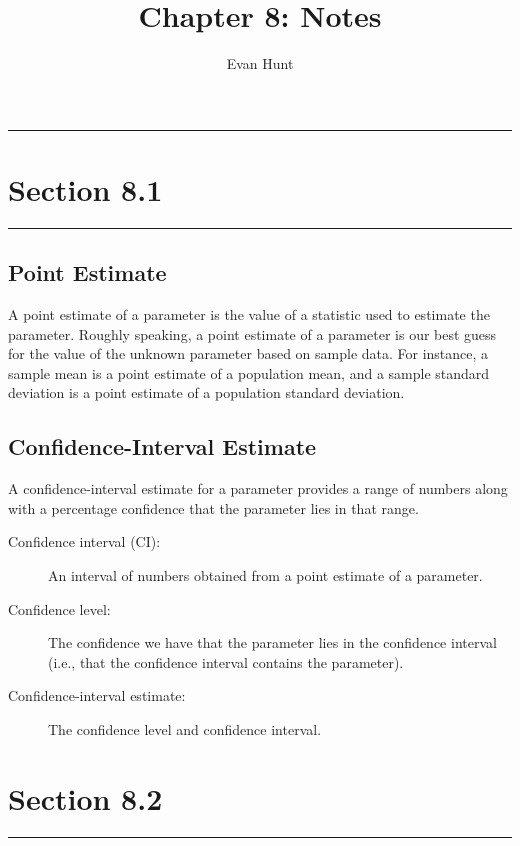 \documentclass[12pt]{article}
\title{Chapter 8: Notes}
\author{Evan Hunt}
\begin{document}
    \maketitle

    \noindent\rule{\textwidth}{0.4pt}
    \section*{Section 8.1}
    \noindent\rule{\textwidth}{0.4pt}
        \subsection*{Point Estimate}
            A point estimate of a parameter is the value of a statistic used to estimate the
            parameter. Roughly speaking, a point estimate of a parameter is our best guess for
            the value of the unknown parameter based on sample data. For instance, a sample mean
            is a point estimate of a population mean, and a sample standard deviation is a point
            estimate of a population standard deviation.
        \subsection*{Confidence-Interval Estimate}
            A confidence-interval estimate for a parameter provides a range of numbers along with
            a percentage confidence that the parameter lies in that range.
        \begin{description}
            \item[Confidence interval (CI):] An interval of numbers obtained from a point
            estimate of a parameter.
            \item[Confidence level:] The confidence we have that the parameter lies in the
            confidence interval (i.e., that the confidence interval contains the parameter). 
            \item[Confidence-interval estimate:] The confidence level and confidence 
            interval. 
        \end{description}
        
    \section*{Section 8.2}
    \noindent\rule{\textwidth}{0.4pt}
\end{document}
